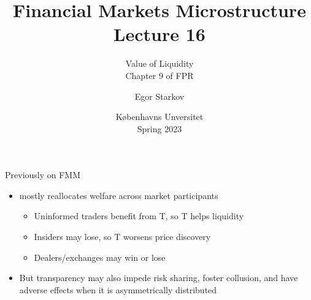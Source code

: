 \documentclass[english,10pt
,aspectratio=169
]{beamer}
\title{Financial Markets Microstructure \\ Lecture 16}
\subtitle{Value of Liquidity\\
	Chapter 9 of FPR}
\author{Egor Starkov}
\date{K{\o}benhavns Unversitet \\
	Spring 2023}
\begin{document}
\frame[plain]{\titlepage}


\begin{frame}{Previously on FMM}
	\begin{itemize}
		\item {} mostly reallocates welfare across market participants 
		\begin{itemize}
			\item Uninformed traders benefit from T, so T {helps liquidity}
			\item Insiders may lose, so T {worsens price discovery}
			\item Dealers/exchanges may win or lose
		\end{itemize}
		\item But transparency may also impede risk sharing, foster collusion, and have adverse effects when it is asymmetrically distributed
	\end{itemize}
\end{frame}
\end{document}
